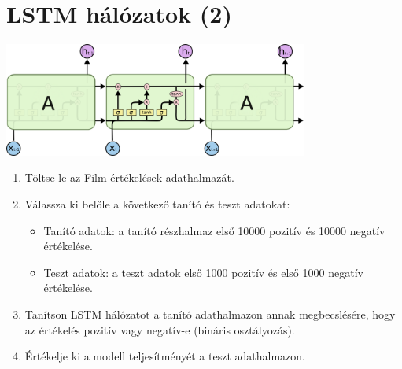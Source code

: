 \documentclass[english]{article}
\begin{document}
\section{LSTM hálózatok (2)}
\begin{center}
\includegraphics[width=10cm, keepaspectratio]{images/lstm.png}
\end{center}
\begin{enumerate}
	\item Töltse le az \href{http://ai.stanford.edu/~amaas/data/sentiment/}{Film értékelések} adathalmazát.
	\item Válassza ki belőle a következő tanító és teszt adatokat: 
	\begin{itemize}
		\item Tanító adatok: a tanító részhalmaz első 10000 pozitív és 10000 negatív értékelése.
		\item Teszt adatok: a teszt adatok első 1000 pozitív és első 1000 negatív értékelése.
	\end{itemize}
	\item Tanítson LSTM hálózatot a tanító adathalmazon annak megbecslésére, hogy az értékelés pozitív vagy negatív-e (bináris osztályozás).
	\item Értékelje ki a modell teljesítményét a teszt adathalmazon.
\end{enumerate}
\end{document}
